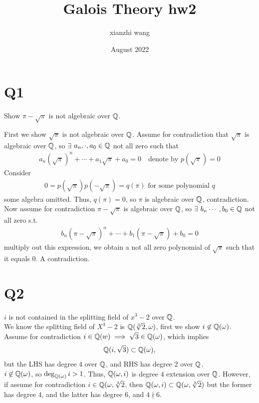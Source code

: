 \documentclass[12pt,english]{article}
\title{Galois Theory hw2}
\author{xianzhi wang}
\date{August 2022}
\begin{document}
\maketitle

\section*{Q1}
\begin{question}
Show $\pi - \sqrt{\pi}$ is not algebraic over $\mathbb{Q}$.
\end{question}
First we show $\sqrt{\pi}$ is not algebraic over $\mathbb{Q}$. Assume for contradiction that $\sqrt{\pi}$ is algebraic over $\mathbb{Q}$, so $\exists$ $a_n,\cdot, a_0\in \mathbb{Q}$ not all zero such that
\begin{align*}
    a_n(\sqrt{\pi})^n +\cdots+a_1 \sqrt{\pi} +a_0 = 0 \quad \text{denote by } p(\sqrt{\pi}) = 0
\end{align*}
Consider 
\begin{align*}
    0 = p(\sqrt{\pi})p(-\sqrt{\pi}) = q(\pi) \text{ for some polynomial } q
\end{align*} some algebra omitted.
Thus, $q(\pi) = 0$, so $\pi$ is algebraic over $\mathbb{Q}$, contradiction. \\

Now assume for contradiction $\pi-\sqrt{\pi}$ is algebraic over $\mathbb{Q}$, so $\exists$ $b_n \cdots, b_0 \in \mathbb{Q}$ not all zero s.t.
\begin{align*}
    b_n(\pi-\sqrt{\pi})^n+\cdots +b_1(\pi-\sqrt{\pi})+b_0 = 0
\end{align*} multiply out this expression, we obtain a not all zero polynomial of $\sqrt{\pi}$ such that it equals $0$. A contradiction. 

\section*{Q2}
$i$ is not contained in the splitting field of $x^3-2$ over $\mathbb{Q}$.\\

We know the splitting field of $X^3-2$ is $\mathbb{Q}(\sqrt[3]{2}, \omega)$, first we show $i \not\in \mathbb{Q}(\omega)$. Assume for contradiction $i \in \mathbb{Q}(w) \implies \sqrt{3} \in \mathbb{Q}(\omega)$, which implies 
\begin{align*}
    \mathbb{Q}(i,\sqrt{3}) \subset \mathbb{Q}(\omega),
\end{align*} but the LHS has degree 4 over $\mathbb{Q}$, and RHS has degree 2 over $\mathbb{Q}$. \\

$i \not\in \mathbb{Q}(\omega)$, so $\deg_{\mathbb{Q}(\omega)}i >1$. Thus, $\mathbb{Q}(\omega,i)$ is degree $4$ extension over $\mathbb{Q}$. However, if assume for contradiction $i \in \mathbb{Q}(\omega,\sqrt[3]{2}$, then $\mathbb{Q}(\omega,i) \subset \mathbb{Q}(\omega, \sqrt[3]{2})$ but the former has degree 4, and the latter has degree 6, and $4 \nmid 6$.
\end{document}
